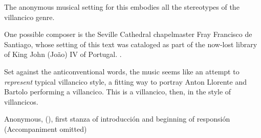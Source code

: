 The anonymous musical setting for this embodies all the stereotypes of the
villancico genre.%
\begin{Footnote}
    One possible composer is the Seville Cathedral chapelmaster Fray Francisco
    de Santiago, whose setting of this text was cataloged as part of the
    now-lost library of King John (João) IV of Portugal. 
    \autocite[caixão 26, ]{JohnIV:Catalog}.
\end{Footnote}
Set against the anticonventional words, the music seems like an attempt to
\emph{represent} typical villancico style, a fitting way to portray Anton
Llorente and Bartolo performing a villancico.
This is a villancico, then, in the style of villancicos.

{Anonymous,  (), first
stanza of introducción and beginning of responsión (Accompaniment omitted)}

